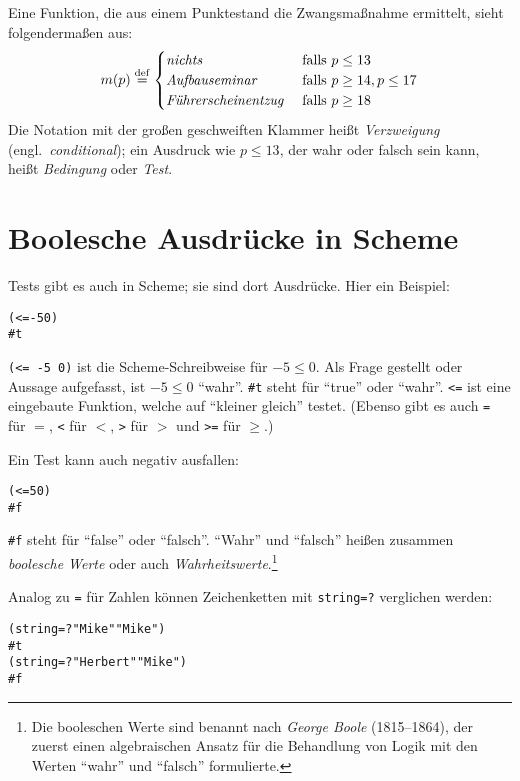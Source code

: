 Eine Funktion, die  aus einem Punktestand die Zwangsmaßnahme ermittelt,
sieht folgendermaßen aus:
%
\begin{displaymath}
  m(p) \stackrel{\rm def}{=}
  \begin{cases}
    \textit{nichts} & \textrm{falls $p \leq 13$}
    \\
    \textit{Aufbauseminar} & \textrm{falls $p \geq 14, p \leq 17$}
    \\
    \textit{Führerscheinentzug } & \textrm{falls $p \geq 18$}
  \end{cases}
\end{displaymath}
%
Die Notation mit der großen geschweiften Klammer heißt
\textit{Verzweigung} (engl.\
\textit{conditional}); ein Ausdruck wie $p\leq 13$,
der wahr oder falsch sein kann,
heißt \textit{Bedingung} oder
\textit{Test}.

\section{Boolesche Ausdrücke in Scheme}

Tests gibt es auch in Scheme; sie sind dort Ausdrücke.
Hier ein Beispiel:
%
\begin{alltt}
(<= -5 0)
\evalsto{} #t
\end{alltt}
%
\texttt{(<= -5 0)} ist die Scheme-Schreibweise für $-5 \leq 0$.  Als Frage
gestellt oder Aussage aufgefasst, ist $-5 \leq 0$ "`wahr"'.
\verb|#t| steht für "`true"' oder
"`wahr\index{wahr}"'.  \texttt{<=}\index{<=@\texttt{<=}} ist eine
eingebaute Funktion, welche auf "`kleiner gleich"' testet.  (Ebenso
gibt es auch \texttt{=}\index{=@\texttt{=}} für $=$, 
\texttt{<} für $<$,
\texttt{>} für $>$ und
\texttt{>=} für $\geq$.)

Ein Test kann auch negativ ausfallen:
%
\begin{alltt}
(<= 5 0)
\evalsto{} #f
\end{alltt}
%
\verb|#f| steht für "`false"' oder "`falsch"'.
"`Wahr"' und "`falsch"' heißen zusammen \textit{boolesche
  Werte} oder auch
\textit{Wahrheitswerte}.\footnote{Die booleschen
  Werte sind benannt nach \textit{George Boole}
  (1815--1864), der zuerst einen algebraischen Ansatz für die
  Behandlung von Logik mit den Werten "`wahr"' und "`falsch"'
  formulierte.}

Analog zu \texttt{=} für Zahlen können Zeichenketten mit
\texttt{string=?} verglichen werden:
\begin{alltt}
(string=? "Mike" "Mike")
\evalsto{} #t
(string=? "Herbert" "Mike")
\evalsto{} #f
\end{alltt}

